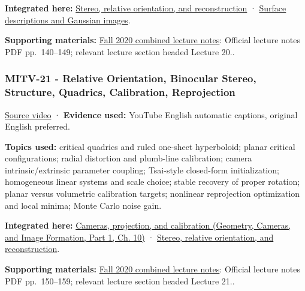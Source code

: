\textbf{Integrated here:} \hyperref[04-visual-computing-ii-ch032-stereo-relative-orientation-and-reconstruction]{Stereo, relative orientation, and reconstruction} · \hyperref[04-visual-computing-ii-ch032-surface-descriptions-and-gaussian-images]{Surface descriptions and Gaussian images}.

\textbf{Supporting materials:} \href{https://ocw.mit.edu/courses/6-801-machine-vision-fall-2020/9ec44f69e72995c370b3797818ba01e6_MIT6_801F20_lectureNotes.pdf}{Fall 2020 combined lecture notes}: Official lecture notes PDF pp.~140--149; relevant lecture section headed Lecture 20..

\subsubsection{MITV-21 - Relative Orientation, Binocular Stereo, Structure, Quadrics, Calibration, Reprojection}\label{04-visual-computing-ii-ch036-mitv-21---relative-orientation-binocular-stereo-structure-quadrics-calibration-reprojection}

\hypertarget{04-visual-computing-ii-ch036-mitv-21---relative-orientation-binocular-stereo-structure-quadrics-calibration-reprojection}{}

\href{https://www.youtube.com/watch?v=-n0cXgPSwOw}{Source video} · \textbf{Evidence used:} YouTube English automatic captions, original English preferred.

\textbf{Topics used:} critical quadrics and ruled one-sheet hyperboloid; planar critical configurations; radial distortion and plumb-line calibration; camera intrinsic/extrinsic parameter coupling; Tsai-style closed-form initialization; homogeneous linear systems and scale choice; stable recovery of proper rotation; planar versus volumetric calibration targets; nonlinear reprojection optimization and local minima; Monte Carlo noise gain.

\textbf{Integrated here:} \href{../03-Geometry-Cameras-and-Image-Formation-P01/main.pdf\#nameddest=03-visual-computing-i-ch003-cameras-projection-and-calibration}{Cameras, projection, and calibration (Geometry, Cameras, and Image Formation, Part 1, Ch. 10)} · \hyperref[04-visual-computing-ii-ch032-stereo-relative-orientation-and-reconstruction]{Stereo, relative orientation, and reconstruction}.

\textbf{Supporting materials:} \href{https://ocw.mit.edu/courses/6-801-machine-vision-fall-2020/9ec44f69e72995c370b3797818ba01e6_MIT6_801F20_lectureNotes.pdf}{Fall 2020 combined lecture notes}: Official lecture notes PDF pp.~150--159; relevant lecture section headed Lecture 21..

